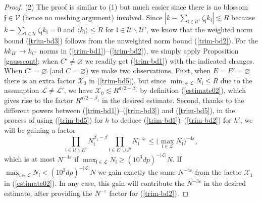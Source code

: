 \documentclass[11 pt,reqno]{amsart}
\theoremstyle{definition}
\theoremstyle{remark}
\numberwithin{equation}{section}
\newcommand{\Lc}{\mathcal{L}}
\newcommand{\Pc}{\mathcal{P}}
\newcommand{\Uc}{\mathcal{U}}
\newcommand{\Vc}{\mathcal{V}}
\newcommand{\Xc}{\mathcal{X}}
\newcommand{\ff}{\mathfrak{f}}
\newcommand{\lf}{\mathfrak{l}}
\begin{document}
{\begin{proof}
(2) The proof is similar to (1) but much easier since there is no blossom $\ff\in\Vc$ (hence no meshing argument) involved. Since $|k-\sum_{\lf\in\Uc'}\zeta_\lf k_\lf|\lesssim R$ because $k-\sum_{\lf\in\Uc}\zeta_\lf k_\lf=0$ and $\langle k_\lf\rangle\leq R$ for $\lf\in\Uc\backslash\Uc'$, we know that the weighted norm bound (\ref{trim-bd3}) follows from the unweighted norm bound (\ref{trim-bd2}). For the $kk_{B'}\to k_{C'}$ norms in (\ref{trim-bd1})--(\ref{trim-bd2}), we simply apply Proposition \ref{gausscont}; when $C'\neq\varnothing$ we readily get (\ref{trim-bd1}) with the indicated changes. When $C'=\varnothing$ (and $C=\varnothing$) we make two observations. First, when $E=E'=\varnothing$ there is an extra factor $\Xc_0$ in (\ref{trim-bd5}), but since $\min_{\lf\in\Lc}N_\lf\leq R$ due to the assumption $\Lc\neq\Lc'$, we have $\Xc_0\lesssim R^{d/2-\beta_1}$ by definition (\ref{estimate02}), which gives rise to the factor $R^{d/2-\beta_1}$ in the desired estimate. Second, thanks to the different powers between (\ref{trim-bd1})--(\ref{trim-bd3}) and (\ref{trim-bd5}), in the process of using (\ref{trim-bd5}) for $h$ to deduce (\ref{trim-bd1})--(\ref{trim-bd2}) for $h'$, we will be gaining a factor
\[\prod_{\lf\in \Uc\backslash E'}N_\lf^{\beta_1-\beta}\prod_{\lf\in E'\cup\Pc}N_\lf^{-4\varepsilon}\leq\big(\max_{\lf\in\Lc}N_\lf\big)^{-4\varepsilon},\] which is at most $N^{-4\varepsilon}$ if $\max_{\lf\in\Lc}N_\lf\geq (10^3dp)^{-|\Lc|}N$. If $\max_{\lf\in\Lc}N_\lf< (10^3dp)^{-|\Lc|}N$ we gain exactly the same $N^{-4\varepsilon}$ from the factor $\Xc_1$ in (\ref{estimate02}). In any case, this gain will contribute the $N^{-3\varepsilon}$ in the desired estimate, after providing the $N^{-\varepsilon}$ factor for (\ref{trim-bd2}).
  \end{proof}
}
\end{document}
